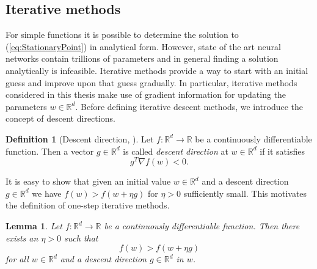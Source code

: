 \documentclass[12pt]{article}
\newtheorem{lemma}[lemma]{Lemma}
\theoremstyle{definition}
\newtheorem{definition}[definition]{Definition}
\numberwithin{equation}{section}
\newcommand{\R}{\mathbb{R}}
\begin{document}
\subsection{Iterative methods}
For simple functions it is possible to determine the solution to (\eqref{eq:StationaryPoint}) in analytical form. However, state of the art neural networks contain trillions of parameters and in general finding a solution analytically is infeasible. Iterative methods provide a way to start with an initial guess and improve upon that guess gradually. In particular, iterative methods considered in this thesis make use of gradient information for updating the parameters $w \in \mathbb{R}^d$. Before defining iterative descent methods, we introduce the concept of descent directions. 
\begin{definition}[Descent direction, ]
  Let $f: \mathbb{R}^d \rightarrow \mathbb{R}$ be a continuously differentiable function. Then a vector $g \in \mathbb{R}^d$ is called \emph{descent direction} at $w \in \mathbb{R}^d$ if it satisfies 
  \begin{equation}
    g^T \nabla f(w) < 0.
  \end{equation} 
\end{definition}
It is easy to show that given an initial value $w \in \mathbb{R}^d$ and a descent direction $g \in \mathbb{R}^d$ we have $f(w) > f(w + \eta g)$ for $\eta > 0$ sufficiently small. This motivates the definition of one-step iterative methods.
\begin{lemma}
  Let $f : \R^d \rightarrow \R$ be a continuously differentiable function. Then there exists an $\eta > 0$ such that
  \begin{equation}
    f(w) > f(w + \eta g)
  \end{equation}
  for all $w \in \R^d$ and a descent direction $g \in \R^d$ in $w$.
\end{lemma}
\end{document}
